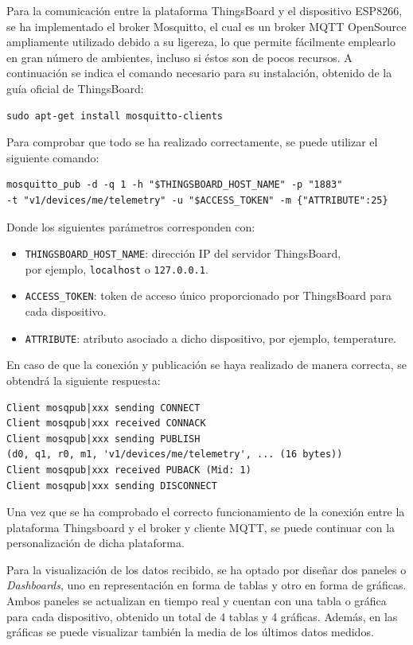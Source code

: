 Para la comunicación entre la plataforma ThingsBoard y el dispositivo ESP8266, se ha implementado el broker Mosquitto, el cual es un broker MQTT OpenSource ampliamente utilizado debido a su ligereza, lo que permite fácilmente emplearlo en gran número de ambientes, incluso si éstos son de pocos recursos. A continuación se indica el comando necesario para su instalación, obtenido de la guía oficial de ThingsBoard:
\begin{verbatim}
sudo apt-get install mosquitto-clients
\end{verbatim}

Para comprobar que todo se ha realizado correctamente, se puede utilizar el siguiente comando:
\begin{verbatim}
mosquitto_pub -d -q 1 -h "$THINGSBOARD_HOST_NAME" -p "1883"
-t "v1/devices/me/telemetry" -u "$ACCESS_TOKEN" -m {"ATTRIBUTE":25}
\end{verbatim}

Donde los siguientes parámetros corresponden con:
\begin{itemize}
    \item \texttt{THINGSBOARD\_HOST\_NAME}: dirección IP del servidor ThingsBoard, \\
    por ejemplo, \texttt{localhost} o \texttt{127.0.0.1}.
    \item \texttt{ACCESS\_TOKEN}: token de acceso único proporcionado por ThingsBoard para cada dispositivo.
    \item \texttt{ATTRIBUTE}: atributo asociado a dicho dispositivo, por ejemplo, temperature.
\end{itemize}

En caso de que la conexión y publicación se haya realizado de manera correcta, se obtendrá la siguiente respuesta:
\begin{verbatim}
Client mosqpub|xxx sending CONNECT
Client mosqpub|xxx received CONNACK
Client mosqpub|xxx sending PUBLISH
(d0, q1, r0, m1, 'v1/devices/me/telemetry', ... (16 bytes))
Client mosqpub|xxx received PUBACK (Mid: 1)
Client mosqpub|xxx sending DISCONNECT
\end{verbatim}

Una vez que se ha comprobado el correcto funcionamiento de la conexión entre la plataforma Thingsboard y el broker y cliente MQTT, se puede continuar con la personalización de dicha plataforma.

Para la visualización de los datos recibido, se ha optado por diseñar dos paneles o \textit{Dashboards}, uno en representación en forma de tablas y otro en forma de gráficas. Ambos paneles se actualizan en tiempo real y cuentan con una tabla o gráfica para cada dispositivo, obtenido un total de 4 tablas y 4 gráficas. Además, en las gráficas se puede visualizar también la media de los últimos datos medidos.

